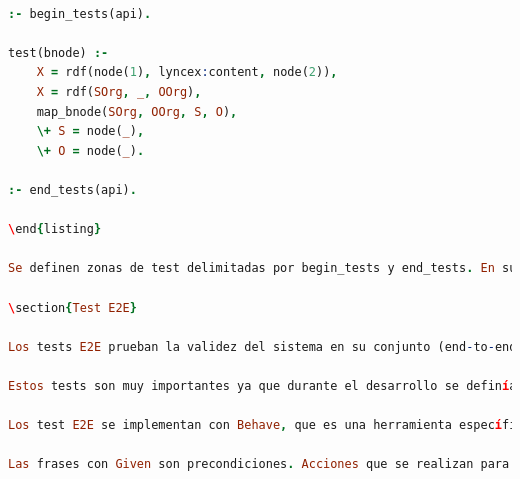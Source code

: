 \documentclass[12pt]{report} %
\begin{document}
\begin{lstlisting}[language=Prolog]

:- begin_tests(api).

test(bnode) :-
    X = rdf(node(1), lyncex:content, node(2)),
    X = rdf(SOrg, _, OOrg),
    map_bnode(SOrg, OOrg, S, O),
    \+ S = node(_),
    \+ O = node(_).

:- end_tests(api).

\end{listing}

Se definen zonas de test delimitadas por begin_tests y end_tests. En su interior definimos reglas test, que deben ser cumplirse. En este ejemplo, queríamos probar la regla map_bnode y si todo va bien, todas los términos deben ser verdaderos. La ejecución de los tests se detalla en el manual de instalación.

\section{Test E2E}

Los tests E2E prueban la validez del sistema en su conjunto (end-to-end, punto a punto). Esto se consigue levantando un servidor de Lyncex e insertando datos de aplicaciones de prueba. Posteriormente, vamos probando que todas las características funcionan tal y como se especificó en los tests. Estos tests se encuentran definidos en la carpeta features.

Estos tests son muy importantes ya que durante el desarrollo se definía cada tarea nueva como un test E2E. Si el código pasa el test creado con anterioridad, significa que la tarea está completada y pasa a formar parte del incremento.

Los test E2E se implementan con Behave, que es una herramienta específica para realizar Behaviour Driven Development (BDD). La idea es definir, en lenguaje natural, las condiciones de aceptación de una característica. Para ello usa las palabras Given/When/Then (y los conectores And/But), más conocido como lenguaje Gherkin. Las principales ventajas de este modelo es que podemos trasladar todas las condiciones de aceptación a código y que los tests los pueden escribir personas con escaso conocimiento técnico. El corolario de la primera consecuencia es que siempre vamos a estar atentos ante regresiones en el código.

Las frases con Given son precondiciones. Acciones que se realizan para dejar el sistema en un estado listo para ejecutar la prueba. Las frases con When (idealmente solo una frase), representan el sujeto a prueba, el estímulo que tenemos que hacer para desencadenar aquello que queremos probar. Finalmente, con Then deberíamos comprobar que el test arroja los resultados esperados. Deben ser principalmente aserciones.


\end{lstlisting}
\end{document}
